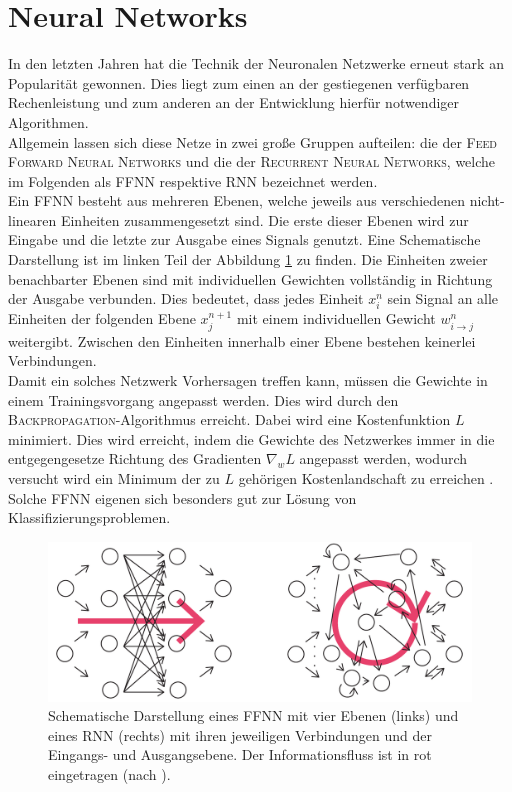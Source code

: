 \section{Neural Networks}
In den letzten Jahren hat die Technik der Neuronalen Netzwerke erneut stark an Popularität gewonnen. Dies liegt zum einen an der gestiegenen verfügbaren Rechenleistung und zum anderen an der Entwicklung hierfür notwendiger Algorithmen.\\
Allgemein lassen sich diese Netze in zwei große Gruppen aufteilen: die der \textsc{Feed Forward Neural Networks} und die der \textsc{Recurrent Neural Networks}, welche im Folgenden als \textsc{FFNN} respektive \textsc{RNN} bezeichnet werden.\\

Ein \textsc{FFNN} besteht aus mehreren Ebenen, welche jeweils aus verschiedenen nicht-linearen Einheiten zusammengesetzt sind. Die erste dieser Ebenen wird zur Eingabe und die letzte zur Ausgabe eines Signals genutzt. Eine Schematische Darstellung ist im linken Teil der Abbildung \ref{fig:ffnn_rnn_structure} zu finden. Die Einheiten zweier benachbarter Ebenen sind mit individuellen Gewichten vollständig in Richtung der Ausgabe verbunden. Dies bedeutet, dass jedes Einheit $x^n_i$ sein Signal an alle Einheiten der folgenden Ebene $x^{n+1}_j$ mit einem individuellen Gewicht $w^n_{i \rightarrow j}$ weitergibt. Zwischen den Einheiten innerhalb einer Ebene bestehen keinerlei Verbindungen.\\
Damit ein solches Netzwerk Vorhersagen treffen kann, müssen die Gewichte in einem Trainingsvorgang angepasst werden. Dies wird durch den \textsc{Backpropagation}-Algorithmus erreicht. Dabei wird eine Kostenfunktion $L$ minimiert. Dies wird erreicht, indem die Gewichte des Netzwerkes immer in die entgegengesetze Richtung des Gradienten $\nabla_w L$ angepasst werden, wodurch versucht wird ein Minimum der zu $L$ gehörigen Kostenlandschaft zu erreichen \cite[S. 225-290]{bishop}. Solche \textsc{FFNN} eigenen sich besonders gut zur Lösung von Klassifizierungsproblemen.\\

\begin{figure}[H]
    \centering
    \includegraphics[width = 0.9 \textwidth]{figures/illustrations/ffnn_rnn_structure.pdf}
    \caption{Schematische Darstellung eines \textsc{FFNN} mit vier Ebenen (links) und eines \textsc{RNN} (rechts) mit ihren jeweiligen Verbindungen und der Eingangs- und Ausgangsebene. Der Informationsfluss ist in rot eingetragen (nach \citep{jeagerTut2002}).}
    \label{fig:ffnn_rnn_structure}
\end{figure}


